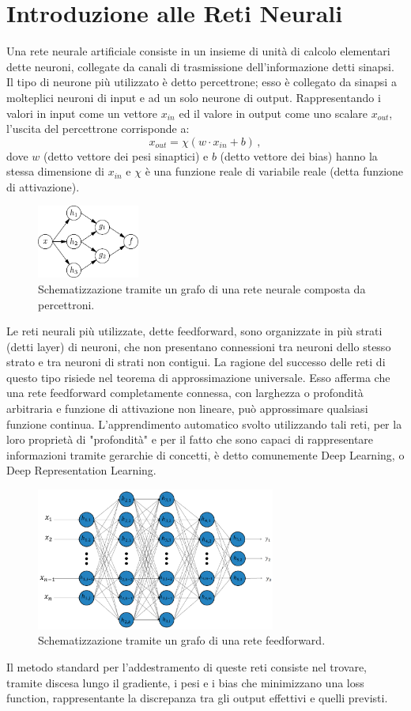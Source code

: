 \documentclass[Lau, noexaminfo, oneside]{sapthesis} %
\begin{document}
\section{Introduzione alle Reti Neurali}
Una rete neurale artificiale consiste in un insieme di unità di calcolo elementari dette neuroni, collegate da canali di trasmissione dell'informazione detti sinapsi.
Il tipo di neurone più utilizzato è detto percettrone; esso è collegato da sinapsi a molteplici neuroni di input e ad un solo neurone di output. Rappresentando i valori in input come un vettore $x_{in}$ ed il valore in output come uno scalare $x_{out}$, l'uscita del percettrone corrisponde a:
\begin{equation}
x_{out} = \chi (w \cdot x_{in} + b) \,,
\end{equation}
dove $w$ (detto vettore dei pesi sinaptici) e $b$ (detto vettore dei bias) hanno la stessa dimensione di $x_{in}$ e $\chi$ è una funzione reale di variabile reale (detta funzione di attivazione).
\begin{figure}[H]
\includegraphics[width=0.3\textwidth]{grafo.pdf}
\centering
\caption{Schematizzazione tramite un grafo di una rete neurale composta da percettroni.}
\end{figure}
Le reti neurali più utilizzate, dette feedforward, sono organizzate in più strati (detti layer) di neuroni, che non presentano connessioni tra neuroni dello stesso strato e tra neuroni di strati non contigui.
La ragione del successo delle reti di questo tipo risiede nel teorema di approssimazione universale. Esso afferma che una rete feedforward completamente connessa, con larghezza o profondità arbitraria e funzione di attivazione non lineare, può approssimare qualsiasi funzione continua. L'apprendimento automatico svolto utilizzando tali reti, per la loro proprietà di "profondità" e per il fatto che sono capaci di rappresentare informazioni tramite gerarchie di concetti, è detto comunemente Deep Learning, o Deep Representation Learning.
\begin{figure}[H]
\includegraphics[width=0.7\textwidth]{information-10-00122-g002.png}
\centering
\caption{Schematizzazione tramite un grafo di una rete feedforward.}
\end{figure}
Il metodo standard per l'addestramento di queste reti consiste nel trovare, tramite discesa lungo il gradiente, i pesi e i bias che minimizzano una loss function, rappresentante la discrepanza tra gli output effettivi e quelli previsti.
\end{document}
